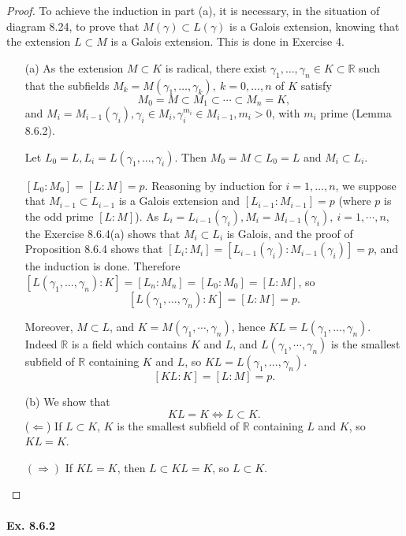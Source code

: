 \documentclass[11pt,a4paper]{article}
\newcommand{\R}{\mathbb{R}}
\begin{document}
\begin{proof}

To achieve the induction in part (a), it is necessary, in the situation of diagram 8.24,  to prove that $M(\gamma) \subset L(\gamma)$ is a Galois extension, knowing that the extension $L\subset M$ is a Galois extension. This is done in Exercise 4.

\begin{enumerate}
\item[(a)]
As the extension $M\subset K$ is radical, there exist  $\gamma_1, \ldots,\gamma_n \in K\subset \R$ such that the subfields  $M_k = M(\gamma_1,\ldots,\gamma_k),\ k=0,\ldots,n$ of $K$ satisfy
$$M_0 = M \subset M_1 \subset \cdots \subset M_n = K,$$
and $M_i = M_{i-1}(\gamma_i), \gamma_i \in M_i, \gamma_i^{m_i} \in M_{i-1}, m_i>0$, with $m_i$ prime (Lemma 8.6.2).

Let $L_0 = L, L_i = L(\gamma_1,\ldots, \gamma_i)$. Then $M_0=M  \subset L_0 = L$ and $M_i \subset L_i$. 


$[L_0:M_0] = [L:M]=p$. Reasoning by induction for $i =1,\ldots,n$, we suppose that $M_{i-1}\subset L_{i-1}$ is a Galois extension and $[L_{i-1} : M_{i-1}] = p$ (where $p$ is the odd prime  $[L:M]$). As $L_i = L_{i-1}(\gamma_i), M_i =M_{i-1}(\gamma_i),\ i=1,\cdots,n$, the Exercise 8.6.4(a) shows that $M_{i}\subset L_{i}$ is Galois, and the proof of Proposition 8.6.4 shows that $[L_i : M_i] = [L_{i-1}(\gamma_i) : M_{i-1}(\gamma_i)] = p$, and the induction is done. Therefore 
$[L(\gamma_1,\ldots,\gamma_n):K] = [L_n:M_n] = [L_0:M_0] = [L:M]$, so
$$[L(\gamma_1,\ldots,\gamma_n):K] = [L:M]=p.$$

Moreover, $M\subset L$, and $K = M(\gamma_1,\cdots,\gamma_n)$, hence $KL = L(\gamma_1,\ldots, \gamma_n)$. Indeed $\R$ is a field which contains $K$ and $L$, and $L(\gamma_1,\cdots, \gamma_n)$ is the smallest subfield of $\R$ containing $K$ and $L$, so $KL = L(\gamma_1,\ldots, \gamma_n)$.
$$[KL : K] = [L:M] = p.$$

\item[(b)]
We show that $$KL = K \iff L \subset K.$$
($\Leftarrow$) If $L \subset K$, $K$ is the smallest subfield of $\R$ containing $L$ and $K$, so $KL = K $.

$(\Rightarrow)$ If $KL=K$, then $L \subset KL = K$, so $L \subset K$.

\end{enumerate}
\end{proof}

\paragraph{Ex. 8.6.2}
\end{document}
